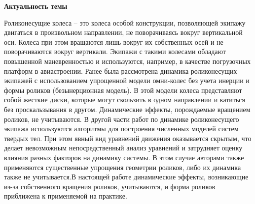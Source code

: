 
\textbf{Актуальность темы}

Роликонесущие колеса – это колеса особой конструкции, позволяющей экипажу двигаться в произвольном направлении, не поворачиваясь вокруг вертикальной оси. Колеса при этом вращаются лишь вокруг их собственных осей и не поворачиваются вокруг вертикали. Экипажи с такими колесами обладают повышенной маневренностью и используются, например, в качестве погрузочных платформ в авиастроении. Ранее была рассмотрена динамика роликонесущих экипажей с использованием упрощенной модели омни-колес без учета инерции и формы роликов (безынерционная модель). В этой модели колеса  представляют собой жесткие диски, которые могут скользить в одном направлении и катиться без проскальзывания в другом. Динамические эффекты, порождаемые вращением роликов, не учитываются. В другой части работ по динамике роликонесущего экипажа используются  алгоритмы для построения численных моделей систем твердых тел. При этом явный вид уравнений движения оказывается скрытым, что делает невозможным непосредственный анализ уравнений и затрудняет оценку влияния разных факторов на динамику системы. В этом случае авторами также применяются существенные упрощения геометрии роликов, либо их динамика также не учитывается.В настоящей работе динамические эффекты, возникающие из-за собственного вращения роликов, учитываются, и форма роликов приближена к применяемой на практике.